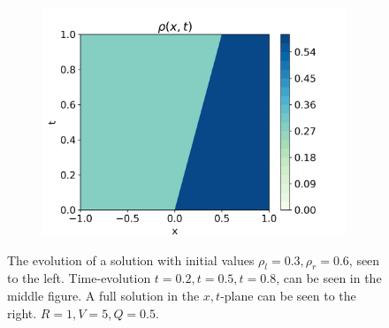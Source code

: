 \documentclass[10pt]{article}
\numberwithin{equation}{section}
\begin{document}
\begin{figure}
     \hfill
     \begin{subfigure}[b]{0.3\textwidth}
         \centering
         \includegraphics[width=\textwidth]{Figures/Model/Plots/ForwShockFull.png}
     \end{subfigure}
        \caption{The evolution of a solution with initial values $\rho_l = 0.3, \rho_r = 0.6$, seen to the left. Time-evolution $t = 0.2, t = 0.5, t = 0.8$, can be seen in the middle figure. A full solution in the $x,t$-plane can be seen to the right. $R = 1, V = 5, Q = 0.5$.}
        \label{fig:ExampleForwardShock}
\end{figure}
\end{document}
